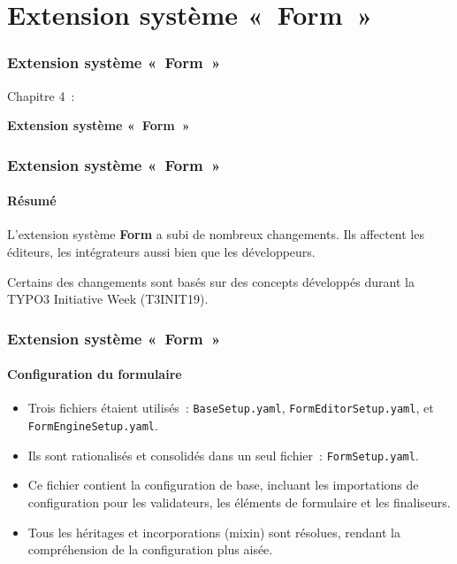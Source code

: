 %

\section{Extension système «~Form~»}
\begin{frame}[fragile]
	\frametitle{Extension système «~Form~»}

	\begin{center}\huge{Chapitre 4~:}\end{center}
	\begin{center}\huge{\color{typo3darkgrey}\textbf{Extension système «~Form~»}}\end{center}

\end{frame}


\begin{frame}[fragile]
	\frametitle{Extension système «~Form~»}
	\framesubtitle{Résumé}

	\small
		L'extension système \textbf{Form} a subi de nombreux changements.
		Ils affectent les éditeurs, les intégrateurs aussi bien que les développeurs.

		\vspace{0.2cm}

		Certains des changements sont basés sur des concepts développés durant la TYPO3 Initiative Week (T3INIT19).

	\normalsize

\end{frame}


\begin{frame}[fragile]
	\frametitle{Extension système «~Form~»}
	\framesubtitle{Configuration du formulaire}

	\begin{itemize}
		\item Trois fichiers étaient utilisés~: \texttt{BaseSetup.yaml}, \texttt{FormEditorSetup.yaml}, et \texttt{FormEngineSetup.yaml}.
		\item Ils sont rationalisés et consolidés dans un seul fichier~: \texttt{FormSetup.yaml}.
		\item Ce fichier contient la configuration de base, incluant les importations de configuration pour les validateurs,
			les éléments de formulaire et les finaliseurs.
		\item Tous les héritages et incorporations (mixin) sont résolues, rendant la compréhension de la configuration plus aisée.
	\end{itemize}

\end{frame}

